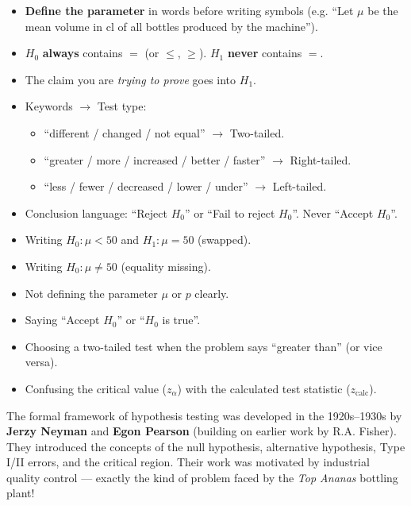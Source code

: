 \documentclass[11pt]{article}
\begin{document}
\begin{aretenir}
\begin{itemize}
  \item \textbf{Define the parameter} in words before writing symbols (e.g. ``Let $\mu$ be the mean volume in cl of all bottles produced by the machine'').
  \item $H_0$ \textbf{always} contains $=$ (or $\le$, $\ge$). $H_1$ \textbf{never} contains $=$.
  \item The claim you are \emph{trying to prove} goes into $H_1$.
  \item Keywords $\rightarrow$ Test type:
    \begin{itemize}
      \item ``different / changed / not equal'' $\rightarrow$ Two-tailed.
      \item ``greater / more / increased / better / faster'' $\rightarrow$ Right-tailed.
      \item ``less / fewer / decreased / lower / under'' $\rightarrow$ Left-tailed.
    \end{itemize}
  \item Conclusion language: ``Reject $H_0$'' or ``Fail to reject $H_0$''. Never ``Accept $H_0$''.
\end{itemize}
\end{aretenir}

\begin{attention}
\begin{itemize}
  \item Writing $H_0: \mu < 50$ and $H_1: \mu = 50$ (swapped).
  \item Writing $H_0: \mu \neq 50$ (equality missing).
  \item Not defining the parameter $\mu$ or $p$ clearly.
  \item Saying ``Accept $H_0$'' or ``$H_0$ is true''.
  \item Choosing a two-tailed test when the problem says ``greater than'' (or vice versa).
  \item Confusing the critical value ($z_\alpha$) with the calculated test statistic ($z_{\text{calc}}$).
\end{itemize}
\end{attention}

\begin{savaistu}
The formal framework of hypothesis testing was developed in the 1920s–1930s by \textbf{Jerzy Neyman} and \textbf{Egon Pearson} (building on earlier work by R.A. Fisher). They introduced the concepts of the null hypothesis, alternative hypothesis, Type I/II errors, and the critical region. Their work was motivated by industrial quality control — exactly the kind of problem faced by the \emph{Top Ananas} bottling plant!
\end{savaistu}
\end{document}
